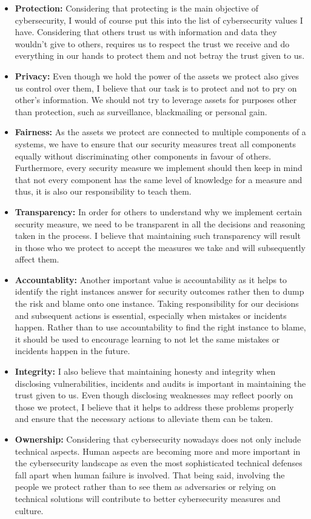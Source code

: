 \documentclass[12pt]{article}
\begin{document}
\begin{itemize}
    \item \textbf{Protection:} Considering that protecting is the main objective of cybersecurity, I would of course put this into the list of cybersecurity values I have. Considering that others trust us with information and data they wouldn't give to others, requires us to respect the trust we receive and do everything in our hands to protect them and not betray the trust given to us.
    \item \textbf{Privacy:} Even though we hold the power of the assets we protect also gives us control over them, I believe that our task is to protect and not to pry on other's information. We should not try to leverage assets for purposes other than protection, such as surveillance, blackmailing or personal gain.
    \item \textbf{Fairness:} As the assets we protect are connected to multiple components of a systems, we have to ensure that our security measures treat all components equally without discriminating other components in favour of others. Furthermore, every security measure we implement should then keep in mind that not every component has the same level of knowledge for a measure and thus, it is also our responsibility to teach them.
    \item \textbf{Transparency:} In order for others to understand why we implement certain security measure, we need to be transparent in all the decisions and reasoning taken in the process. I believe that maintaining such transparency will result in those who we protect to accept the measures we take and will subsequently affect them.
    \item \textbf{Accountablity:} Another important value is accountability as it helps to identify the right instances answer for security outcomes rather then to dump the risk and blame onto one instance. Taking responsibility for our decisions and subsequent actions is essential, especially when mistakes or incidents happen. Rather than to use accountability to find the right instance to blame, it should be used to encourage learning to not let the same mistakes or incidents happen in the future.
    \item \textbf{Integrity:} I also believe that maintaining honesty and integrity when disclosing vulnerabilities, incidents and audits is important in maintaining the trust given to us. Even though disclosing weaknesses may reflect poorly on those we protect, I believe that it helps to address these problems properly and ensure that the necessary actions to alleviate them can be taken.
    \item \textbf{Ownership:} Considering that cybersecurity nowadays does not only include technical aspects. Human aspects are becoming more and more important in the cybersecurity landscape as even the most sophisticated technical defenses fall apart when human failure is involved. That being said, involving the people we protect rather than to see them as adversaries or relying on technical solutions will contribute to better cybersecurity measures and culture.
\end{itemize}
\end{document}
